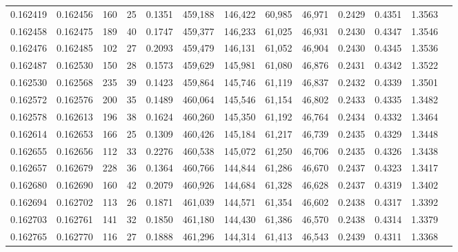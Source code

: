 \begin{tabular}{rrrrrrrrrrrrr}
0.162419 & 0.162456 &   160 &  25 &                                     0.1351 & 459,188 & 146,422 &  60,985 &  46,971 & 0.2429 & 0.4351 & 1.3563 \\
0.162458 & 0.162475 &   189 &  40 &                                     0.1747 & 459,377 & 146,233 &  61,025 &  46,931 & 0.2430 & 0.4347 & 1.3546 \\
0.162476 & 0.162485 &   102 &  27 &                                     0.2093 & 459,479 & 146,131 &  61,052 &  46,904 & 0.2430 & 0.4345 & 1.3536 \\
0.162487 & 0.162530 &   150 &  28 &                                     0.1573 & 459,629 & 145,981 &  61,080 &  46,876 & 0.2431 & 0.4342 & 1.3522 \\
0.162530 & 0.162568 &   235 &  39 &                                     0.1423 & 459,864 & 145,746 &  61,119 &  46,837 & 0.2432 & 0.4339 & 1.3501 \\
0.162572 & 0.162576 &   200 &  35 &                                     0.1489 & 460,064 & 145,546 &  61,154 &  46,802 & 0.2433 & 0.4335 & 1.3482 \\
0.162578 & 0.162613 &   196 &  38 &                                     0.1624 & 460,260 & 145,350 &  61,192 &  46,764 & 0.2434 & 0.4332 & 1.3464 \\
0.162614 & 0.162653 &   166 &  25 &                                     0.1309 & 460,426 & 145,184 &  61,217 &  46,739 & 0.2435 & 0.4329 & 1.3448 \\
0.162655 & 0.162656 &   112 &  33 &                                     0.2276 & 460,538 & 145,072 &  61,250 &  46,706 & 0.2435 & 0.4326 & 1.3438 \\
0.162657 & 0.162679 &   228 &  36 &                                     0.1364 & 460,766 & 144,844 &  61,286 &  46,670 & 0.2437 & 0.4323 & 1.3417 \\
0.162680 & 0.162690 &   160 &  42 &                                     0.2079 & 460,926 & 144,684 &  61,328 &  46,628 & 0.2437 & 0.4319 & 1.3402 \\
0.162694 & 0.162702 &   113 &  26 &                                     0.1871 & 461,039 & 144,571 &  61,354 &  46,602 & 0.2438 & 0.4317 & 1.3392 \\
0.162703 & 0.162761 &   141 &  32 &                                     0.1850 & 461,180 & 144,430 &  61,386 &  46,570 & 0.2438 & 0.4314 & 1.3379 \\
0.162765 & 0.162770 &   116 &  27 &                                     0.1888 & 461,296 & 144,314 &  61,413 &  46,543 & 0.2439 & 0.4311 & 1.3368 \\

\end{tabular}
